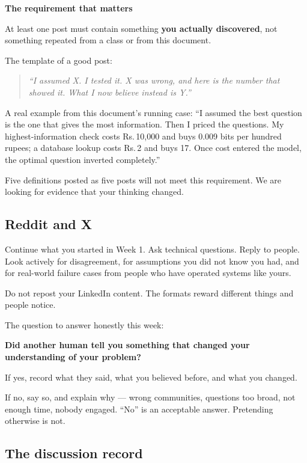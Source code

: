 \documentclass[11pt,a4paper]{article}
\newcommand{\rs}{Rs.\,}
\newcommand{\boxtitle}[1]{{\bfseries #1}\par\vspace{2pt}}
\begin{document}
\begin{sbbox}
\boxtitle{The requirement that matters}
At least one post must contain something \textbf{you actually discovered}, not something repeated
from a class or from this document.

The template of a good post:

\begin{quote}\itshape
``I assumed X. I tested it. X was wrong, and here is the number that showed it. What I now
believe instead is Y.''
\end{quote}

A real example from this document's running case: ``I assumed the best question is the one that
gives the most information. Then I priced the questions. My highest-information check costs
\rs 10{,}000 and buys 0.009 bits per hundred rupees; a database lookup costs \rs 2 and buys 17.
Once cost entered the model, the optimal question inverted completely.''

Five definitions posted as five posts will not meet this requirement. We are looking for evidence
that your thinking changed.
\end{sbbox}

\subsection{Reddit and X}

Continue what you started in Week 1. Ask technical questions. Reply to people. Look actively for
disagreement, for assumptions you did not know you had, and for real-world failure cases from
people who have operated systems like yours.

Do not repost your LinkedIn content. The formats reward different things and people notice.

The question to answer honestly this week:

\begin{sbrule}
\textbf{Did another human tell you something that changed your understanding of your problem?}

If yes, record what they said, what you believed before, and what you changed.

If no, say so, and explain why --- wrong communities, questions too broad, not enough time,
nobody engaged. ``No'' is an acceptable answer. Pretending otherwise is not.
\end{sbrule}

\subsection{The discussion record}
\end{document}
